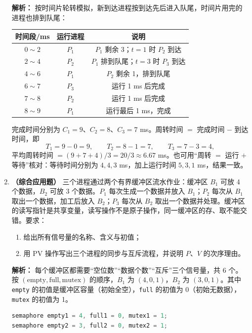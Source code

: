 \begin{enumerate}[resume]
\ifshowsolutions\par\noindent\textbf{解析：} 按时间片轮转模拟，新到达进程按到达先后进入队尾，时间片用完的进程也排到队尾：
\begin{center}
\begin{tabular}{|c|c|c|}
\hline
时间段/ms & 运行进程 & 说明 \\
\hline
$0\sim 2$ & $P_1$ & $P_1$ 剩余 3；$t=1$ 时 $P_2$ 到达 \\
$2\sim 4$ & $P_2$ & $P_1$ 排到队尾；$t=3$ 时 $P_3$ 到达 \\
$4\sim 6$ & $P_1$ & $P_2$ 剩余 1，排到队尾 \\
$6\sim 7$ & $P_3$ & 运行 1 ms 后完成 \\
$7\sim 8$ & $P_2$ & 运行 1 ms 后完成 \\
$8\sim 9$ & $P_1$ & 运行最后 1 ms，完成 \\
\hline
\end{tabular}
\end{center}
完成时间分别为 $C_1=9$、$C_2=8$、$C_3=7$ ms。周转时间 $=$ 完成时间 $-$ 到达时间，即
\[
T_1=9-0=9,\qquad T_2=8-1=7,\qquad T_3=7-3=4,
\]
平均周转时间 $=(9+7+4)/3=20/3\approx 6.67$ ms。也可用“周转 $=$ 运行 $+$ 等待”核对：等待时间分别为 $4,4,3$ ms，加上运行时间 $5,3,1$ ms，结果一致。\else \answerarea[10] \fi

\vspace{8pt}

\item \textbf{（综合应用题）} 三个进程通过两个有界缓冲区流水作业：缓冲区 $B_1$ 可放 4 个数据，$B_2$ 可放 3 个数据。$P_1$ 每次生成一个数据并放入 $B_1$；$P_2$ 每次从 $B_1$ 取出一个数据，加工后放入 $B_2$；$P_3$ 每次从 $B_2$ 取出一个数据并处理。缓冲区的读写指针是共享变量，读写操作不是原子操作，同一缓冲区的存、取不能交错。要求：
\begin{enumerate}
    \item 给出所有信号量的名称、含义与初值；
    \item 用 PV 操作写出三个进程的同步与互斥流程，并说明 $P$、$V$ 的次序理由。
\end{enumerate}

\ifshowsolutions\par\noindent\textbf{解析：} 每个缓冲区都需要“空位数”“数据个数”“互斥”三个信号量，共 6 个。按 $(\text{empty},\text{full},\text{mutex})$ 的顺序，$B_1$ 为 $(4,0,1)$，$B_2$ 为 $(3,0,1)$。其中 \texttt{empty} 的初值是缓冲区容量（初始全空），\texttt{full} 的初值为 0（初始无数据），\texttt{mutex} 的初值为 1。
\begin{lstlisting}[language=C]
semaphore empty1 = 4, full1 = 0, mutex1 = 1;
semaphore empty2 = 3, full2 = 0, mutex2 = 1;


\end{lstlisting}
\end{enumerate}

